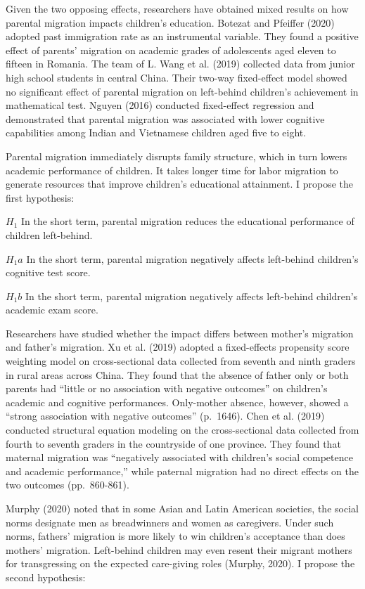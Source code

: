 \documentclass[
  man,floatsintext]{apa7}
\begin{document}
Given the two opposing effects, researchers have obtained mixed results on how parental migration impacts children's education. Botezat and Pfeiffer (2020) adopted past immigration rate as an instrumental variable. They found a positive effect of parents' migration on academic grades of adolescents aged eleven to fifteen in Romania. The team of L. Wang et al. (2019) collected data from junior high school students in central China. Their two-way fixed-effect model showed no significant effect of parental migration on left-behind children's achievement in mathematical test. Nguyen (2016) conducted fixed-effect regression and demonstrated that parental migration was associated with lower cognitive capabilities among Indian and Vietnamese children aged five to eight.

Parental migration immediately disrupts family structure, which in turn lowers academic performance of children. It takes longer time for labor migration to generate resources that improve children's educational attainment. I propose the first hypothesis:

\(H_1\) In the short term, parental migration reduces the educational performance of children left-behind.

\(H_1a\) In the short term, parental migration negatively affects left-behind children's cognitive test score.

\(H_1b\) In the short term, parental migration negatively affects left-behind children's academic exam score.

Researchers have studied whether the impact differs between mother's migration and father's migration. Xu et al. (2019) adopted a fixed-effects propensity score weighting model on cross-sectional data collected from seventh and ninth graders in rural areas across China. They found that the absence of father only or both parents had ``little or no association with negative outcomes'' on children's academic and cognitive performances. Only-mother absence, however, showed a ``strong association with negative outcomes'' (p.~1646). Chen et al. (2019) conducted structural equation modeling on the cross-sectional data collected from fourth to seventh graders in the countryside of one province. They found that maternal migration was ``negatively associated with children's social competence and academic performance,'' while paternal migration had no direct effects on the two outcomes (pp.~860-861).

Murphy (2020) noted that in some Asian and Latin American societies, the social norms designate men as breadwinners and women as caregivers. Under such norms, fathers' migration is more likely to win children's acceptance than does mothers' migration. Left-behind children may even resent their migrant mothers for transgressing on the expected care-giving roles (Murphy, 2020). I propose the second hypothesis:
\end{document}
